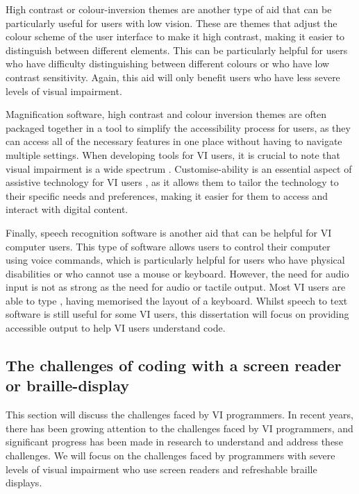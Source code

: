 \documentclass{l4proj}
\begin{document}
High contrast or colour-inversion themes are another type of aid that can be particularly useful for users with low vision. These are themes that adjust the colour scheme of the user interface to make it high contrast, making it easier to distinguish between different elements. This can be particularly helpful for users who have difficulty distinguishing between different colours or who have low contrast sensitivity. Again, this aid will only benefit users who have less severe levels of visual impairment.

Magnification software, high contrast and colour inversion themes are often packaged together in a tool to simplify the accessibility process for users, as they can access all of the necessary features in one place without having to navigate multiple settings. When developing tools for VI users, it is crucial to note that visual impairment is a wide spectrum \cite{WHO_2021}. Customise-ability is an essential aspect of assistive technology for VI users \cite{keates2003countering}, as it allows them to tailor the technology to their specific needs and preferences, making it easier for them to access and interact with digital content. 

Finally, speech recognition software is another aid that can be helpful for VI computer users. This type of software allows users to control their computer using voice commands, which is particularly helpful for users who have physical disabilities or who cannot use a mouse or keyboard. However, the need for audio input is not as strong as the need for audio or tactile output. Most VI users are able to type \cite{miele2017assistive}, having memorised the layout of a keyboard. Whilst speech to text software is still useful for some VI users, this dissertation will focus on providing accessible output to help VI users understand code.




\subsection{The challenges of coding with a screen reader or braille-display}


This section will discuss the challenges faced by VI programmers. In recent years, there has been growing attention to the challenges faced by VI programmers, and significant progress has been made in research to understand and address these challenges. We will focus on the challenges faced by programmers with severe levels of visual impairment who use screen readers and refreshable braille displays.
\end{document}
